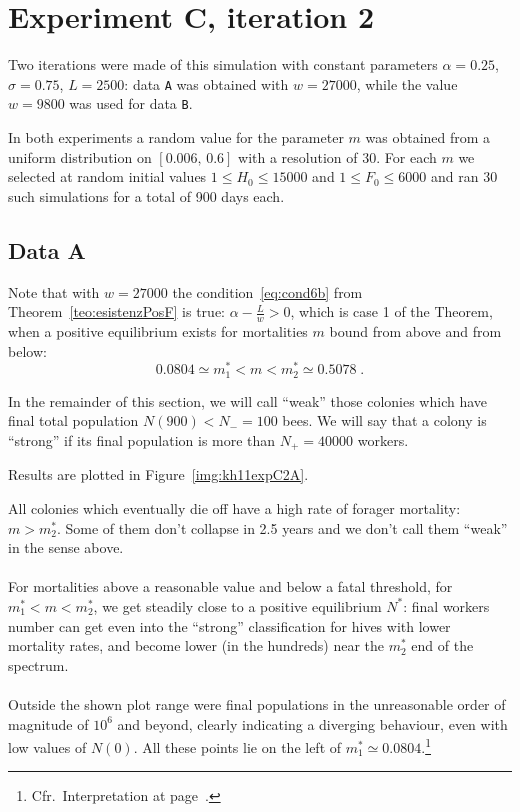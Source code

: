 \section{Experiment C, iteration 2}
Two iterations were made of this simulation with constant parameters $\alpha = 0.25$, $\sigma=0.75$, $L=2500$:
data \texttt{A} was obtained with $w=27000$, while the value $w=9800$ was used for data \texttt{B}.

In both experiments a random value for the parameter $m$ was obtained from a uniform distribution on $[0.006, \, 0.6]$
with a resolution of 30. For each $m$ we selected at random initial values $1 \leq H_0 \leq 15000$ and $1 \leq F_0 \leq 6000$ and ran 30 such simulations for a total of 900 days each.

\subsection{Data A}
\label{sec:kh11expC2A}
Note that with $w=27000$ the condition~\eqref{eq:cond6b} from Theorem~\ref{teo:esistenzPosF} is true: $\alpha - \frac{L}{w} > 0$, which is case 1 of the Theorem,
when a positive equilibrium exists for mortalities $m$ bound from above and from below:
$$ 0.0804 \simeq m_1^* < m < m_2^* \simeq 0.5078 \; .$$

In the remainder of this section, we will call ``weak'' those colonies which have final total
population $N(900) < N_- = 100$ bees. We will say that a colony is ``strong'' if
its final population is more than $N_+ = 40000$ workers.

Results are plotted in Figure~\ref{img:kh11expC2A}.

All colonies which eventually die off have a high rate of forager mortality: $m > m_2^*$.
Some of them don't collapse in 2.5 years and we don't call them ``weak'' in the sense above.

\paragraph{}
For mortalities above a reasonable value and below a fatal threshold, \ie for $m_1^* < m < m_2^*$,
we get steadily close to a positive equilibrium $N^*$: final workers number can get even into
the ``strong'' classification for hives with lower mortality rates, and become lower
(in the hundreds) near the $m_2^*$ end of the spectrum.

\paragraph{}
Outside the shown plot range were final populations in the unreasonable order of
magnitude of $10^6$ and beyond, clearly indicating a diverging behaviour, even with low values of $N(0)$.
All these points lie on the left of $m_1^* \simeq 0.0804$.\footnote{Cfr.~Interpretation at page~\pageref{par:interpretationCond6b}.}

